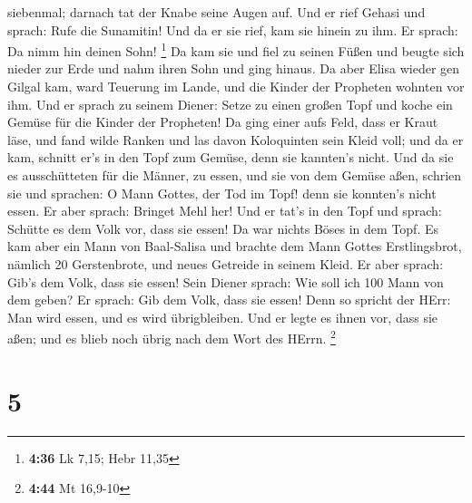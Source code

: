 siebenmal; darnach tat der Knabe seine Augen auf.  Und er
rief Gehasi und sprach: Rufe die Sunamitin! Und da er sie rief, kam sie
hinein zu ihm. Er sprach: Da nimm hin deinen Sohn! \footnote{\textbf{4:36}
  Lk 7,15; Hebr 11,35}  Da kam sie und fiel zu seinen Füßen
und beugte sich nieder zur Erde und nahm ihren Sohn und ging hinaus.
 Da aber Elisa wieder gen Gilgal kam, ward Teuerung im
Lande, und die Kinder der Propheten wohnten vor ihm. Und er sprach zu
seinem Diener: Setze zu einen großen Topf und koche ein Gemüse für die
Kinder der Propheten!  Da ging einer aufs Feld, dass er
Kraut läse, und fand wilde Ranken und las davon Koloquinten sein Kleid
voll; und da er kam, schnitt er's in den Topf zum Gemüse, denn sie
kannten's nicht.  Und da sie es ausschütteten für die
Männer, zu essen, und sie von dem Gemüse aßen, schrien sie und sprachen:
O Mann Gottes, der Tod im Topf! denn sie konnten's nicht essen.
 Er aber sprach: Bringet Mehl her! Und er tat's in den Topf
und sprach: Schütte es dem Volk vor, dass sie essen! Da war nichts Böses
in dem Topf.  Es kam aber ein Mann von Baal-Salisa und
brachte dem Mann Gottes Erstlingsbrot, nämlich 20 Gerstenbrote, und
neues Getreide in seinem Kleid. Er aber sprach: Gib's dem Volk, dass sie
essen!  Sein Diener sprach: Wie soll ich 100 Mann von dem
geben? Er sprach: Gib dem Volk, dass sie essen! Denn so spricht der
HErr: Man wird essen, und es wird übrigbleiben.  Und er
legte es ihnen vor, dass sie aßen; und es blieb noch übrig nach dem Wort
des HErrn. \footnote{\textbf{4:44} Mt 16,9-10}

\hypertarget{section-2}{%
\section{5}\label{section-2}}

